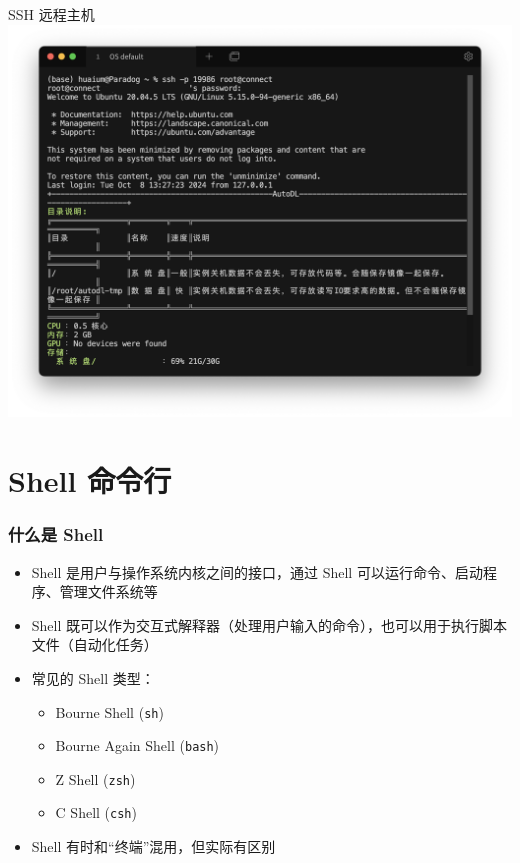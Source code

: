 \documentclass[UTF8, 16pt]{beamer}
\begin{document}
\begin{frame}
    \centering
    \textcolor{sufered}{SSH 远程主机}
    \includegraphics[width=0.95\linewidth]{ssh.png}
\end{frame}

\section{Shell 命令行}

\begin{frame}
    \frametitle{什么是 Shell}
    \begin{itemize}
        \item Shell 是用户与操作系统内核之间的接口，通过 Shell 可以运行命令、启动程序、管理文件系统等
        \item Shell 既可以作为交互式解释器（处理用户输入的命令），也可以用于执行脚本文件（自动化任务）
        \item 常见的 Shell 类型：
              \begin{itemize}
                  \item Bourne Shell (\texttt{sh})
                  \item Bourne Again Shell (\texttt{bash})
                  \item Z Shell (\texttt{zsh})
                  \item C Shell (\texttt{csh})
              \end{itemize}
        \item Shell 有时和“终端”混用，但实际有区别
    \end{itemize}
\end{frame}
\end{document}
